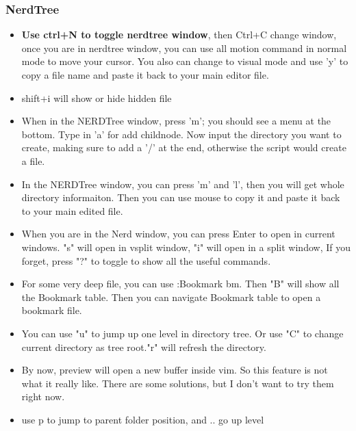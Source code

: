 \documentclass[a4paper,12pt,twoside]{book}
\begin{document}
\subsubsection{NerdTree}
\begin{itemize}
		
		\item \textbf{Use ctrl+N to toggle nerdtree window}, then Ctrl+C change window, once you are in nerdtree window, you can use all motion command in normal mode to move your cursor. You also can change to visual mode and use 'y' to copy a file name and paste it back to your main editor file.  

		\item shift+i will show or hide hidden file

		\item When in the NERDTree window, press 'm'; you should see a menu at the bottom. Type in 'a' for add childnode. Now input the directory you want to create, making sure to add a '/' at the end, otherwise the script would create a file.

		\item In the NERDTree window, you can press 'm' and 'l', then you will get whole directory informaiton. Then you can use mouse to copy it and paste it back to your main edited file.

		\item When you are in the Nerd window, you can press Enter to open in current windows. "s" will open in vsplit window, "i" will open in a split window, If you forget, press "?" to toggle to show all the useful commands.

		\item For some very deep file, you can use :Bookmark bm. Then "B" will show all the Bookmark table. Then you can navigate Bookmark table to open a bookmark file.

		\item You can use "u" to jump up one level in directory tree. Or use "C" to change current directory as tree root."r" will refresh the directory.

		\item By now, preview will open a new buffer inside vim. So this feature is not what it really like. There are some solutions, but I don't want to try them right now.

		\item use p to jump to parent folder position, and .. go up level
\end{itemize}
\end{document}

